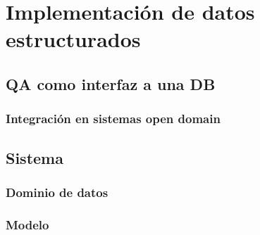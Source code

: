 \chapter{Implementación de datos estructurados}

\section{QA como interfaz a una DB}
\subsection{Integración en sistemas open domain}
\section{Sistema}
\subsection{Dominio de datos}
\subsection{Modelo}

